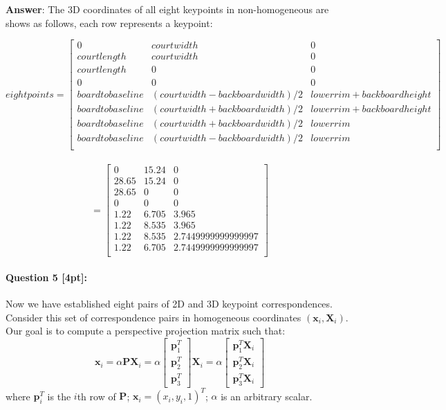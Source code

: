 \documentclass[11pt]{article}
\begin{document}
\textbf{Answer}: The 3D coordinates of all eight keypoints in non-homogeneous are shows as follows, each row represents a keypoint:

\[ eight points = 
\left[
\begin{array}{ccc}
    0 & court width & 0 \\
    court length & court width & 0 \\
    court length & 0 & 0 \\
    0 & 0 & 0 \\
    board to baseline & (court width - backboard width)/2 & lower rim + backboard height\\
    board to baseline & (court width + backboard width)/2 & lower rim + backboard height\\
    board to baseline & (court width + backboard width)/2 & lower rim\\
    board to baseline & (court width - backboard width)/2 & lower rim\\
\end{array}
\right] \]
\\
\[= 
\left[
\begin{array}{ccc}
    0 & 15.24 & 0 \\ 
    28.65 & 15.24 & 0 \\
    28.65 & 0 & 0 \\
    0 &  0 & 0 \\ 
    1.22 & 6.705 & 3.965 \\ 
    1.22 & 8.535 & 3.965 \\ 
    1.22 & 8.535 & 2.7449999999999997 \\ 
    1.22 & 6.705 & 2.7449999999999997\\
\end{array}
\right]
\]

\paragraph{Question 5 [4pt]:} 
Now we have established eight pairs of 2D and 3D keypoint correspondences. 
Consider this set of correspondence pairs in homogeneous coordinates $(\mathbf{x}_i, \mathbf{X}_i)$. Our goal is to compute a perspective projection matrix such that: 
\[
\mathbf{x}_i = \alpha \mathbf{P} \mathbf{X}_i = 
\alpha \left[
\begin{array}{c}
\mathbf{p}_1^T \\
\mathbf{p}_2^T \\
\mathbf{p}_3^T
\end{array}
\right]
\mathbf{X}_i
= 
\alpha \left[
\begin{array}{c}
\mathbf{p}_1^T\mathbf{X}_i \\
\mathbf{p}_2^T\mathbf{X}_i \\
\mathbf{p}_3^T\mathbf{X}_i
\end{array}
\right]
\]
where $\mathbf{p}_i^T$ is the $i$th row of $\mathbf{P}$; $\mathbf{x}_i = (x_i, y_i, 1)^T$; $\alpha$ is an arbitrary scalar. 
\end{document}
